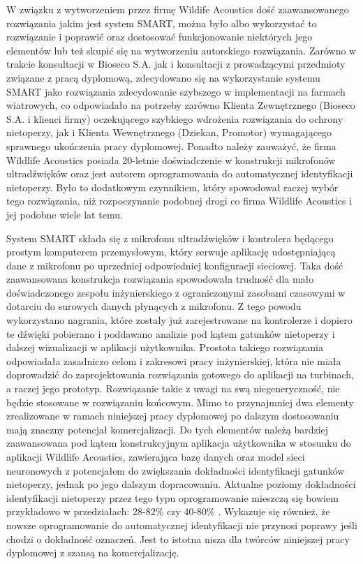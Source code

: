 \documentclass{sprz}
\begin{document}
W związku z wytworzeniem przez firmę Wildife Acoustics dość zaawansowanego rozwiązania jakim jest system SMART, można było albo wykorzystać to rozwiązanie i poprawić oraz dostosować funkcjonowanie niektórych jego elementów lub też skupić się na wytworzeniu autorskiego rozwiązania. Zarówno w trakcie konsultacji w Bioseco S.A. jak i konsultacji z prowadzącymi przedmioty związane z pracą dyplomową, zdecydowano się na wykorzystanie systemu SMART jako rozwiązania zdecydowanie szybszego w implementacji na farmach wiatrowych, co odpowiadało na potrzeby zarówno Klienta Zewnętrznego (Bioseco S.A. i klienci firmy) oczekującego szybkiego wdrożenia rozwiązania do ochrony nietoperzy, jak i Klienta Wewnętrznego (Dziekan, Promotor) wymagającego sprawnego ukończenia pracy dyplomowej.
Ponadto należy zauważyć, że firma Wildlife Acoustics posiada 20-letnie doświadczenie w konstrukcji mikrofonów ultradźwięków oraz jest autorem oprogramowania do automatycznej identyfikacji nietoperzy. Było to dodatkowym czynnikiem, który spowodował raczej wybór tego rozwiązania, niż rozpoczynanie podobnej drogi co firma Wildlife Acoustics i jej podobne wiele lat temu.

System SMART składa się z mikrofonu ultradźwięków i kontrolera będącego prostym komputerem przemysłowym, który serwuje aplikację udostępniającą dane z mikrofonu po uprzedniej odpowiedniej konfiguracji sieciowej. Taka dość zaawansowana konstrukcja rozwiązania spowodowała trudność dla mało doświadczonego zespołu inżynierskiego z ograniczonymi zasobami czasowymi w dotarciu do surowych danych płynących z mikrofonu. Z tego powodu wykorzystano nagrania, które zostały już zarejestrowane na kontrolerze i dopiero te dźwięki pobierano i poddawano analizie pod kątem gatunków nietoperzy i dalszej wizualizacji w aplikacji użytkownika. Prostota takiego rozwiązania odpowiadała zasadniczo celom i zakresowi pracy inżynierskiej, która nie miała doprowadzić do zaprojektowania rozwiązania gotowego do aplikacji na turbinach, a raczej jego prototyp. Rozwiązanie takie z uwagi na swą niegeneryczność, nie będzie stosowane w rozwiązaniu końcowym. Mimo to przynajmniej dwa elementy zrealizowane w ramach niniejszej pracy dyplomowej po dalszym dostosowaniu mają znaczny potencjał komercjalizacji. Do tych elementów należą bardziej zaawansowana pod kątem konstrukcyjnym aplikacja użytkownika w stosunku do aplikacji Wildlife Acoustics, zawierająca bazę danych oraz model sieci neuronowych z potencjałem do zwiększania dokładności identyfikacji gatunków nietoperzy, jednak po jego dalszym dopracowaniu. Aktualne poziomy dokładności identyfikacji nietoperzy przez tego typu oprogramowanie mieszczą się bowiem przykładowo w przedziałach: 28-82\% \cite{kaleidoscope-accuracy} czy 40-80\% \cite{kaleidoscope-bias}. Wykazuje się również, że nowsze oprogramowanie do automatycznej identyfikacji nie przynosi poprawy jeśli chodzi o dokładność oznaczeń. Jest to istotna nisza dla twórców niniejszej pracy dyplomowej z szansą na komercjalizację.
\end{document}
